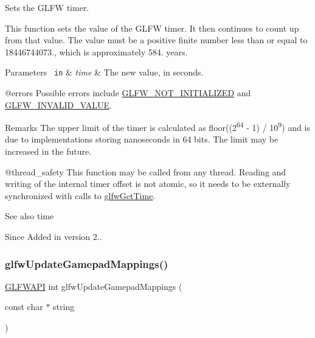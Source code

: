 Sets the G\+L\+FW timer. 

This function sets the value of the G\+L\+FW timer. It then continues to count up from that value. The value must be a positive finite number less than or equal to 18446744073., which is approximately 584. years.


\begin{DoxyParams}[1]{Parameters}
\mbox{\texttt{ in}}  & {\em time} & The new value, in seconds.\\
\hline
\end{DoxyParams}
@errors Possible errors include \mbox{\hyperlink{group__errors_ga2374ee02c177f12e1fa76ff3ed15e14a}{G\+L\+F\+W\+\_\+\+N\+O\+T\+\_\+\+I\+N\+I\+T\+I\+A\+L\+I\+Z\+ED}} and \mbox{\hyperlink{group__errors_gaaf2ef9aa8202c2b82ac2d921e554c687}{G\+L\+F\+W\+\_\+\+I\+N\+V\+A\+L\+I\+D\+\_\+\+V\+A\+L\+UE}}.

\begin{DoxyRemark}{Remarks}
The upper limit of the timer is calculated as floor((2\textsuperscript{64} -\/ 1) / 10\textsuperscript{9}) and is due to implementations storing nanoseconds in 64 bits. The limit may be increased in the future.
\end{DoxyRemark}
@thread\+\_\+safety This function may be called from any thread. Reading and writing of the internal timer offset is not atomic, so it needs to be externally synchronized with calls to \mbox{\hyperlink{group__input_ga03d4a1039b8662c71eeb40beea8cb622}{glfw\+Get\+Time}}.

\begin{DoxySeeAlso}{See also}
time
\end{DoxySeeAlso}
\begin{DoxySince}{Since}
Added in version 2.. 
\end{DoxySince}
\mbox{\label{group__input_ga276a2aec236a671a99f6f0a9be7fa3fc}} 
\subsubsection{\texorpdfstring{glfwUpdateGamepadMappings()}{glfwUpdateGamepadMappings()}}
{\footnotesize\ttfamily \mbox{\hyperlink{glfw3_8h_a56da5036b2cc259351ae22fd6439bb47}{G\+L\+F\+W\+A\+PI}} int glfw\+Update\+Gamepad\+Mappings (\begin{DoxyParamCaption}\item[{const char $\ast$}]{string }\end{DoxyParamCaption})}



